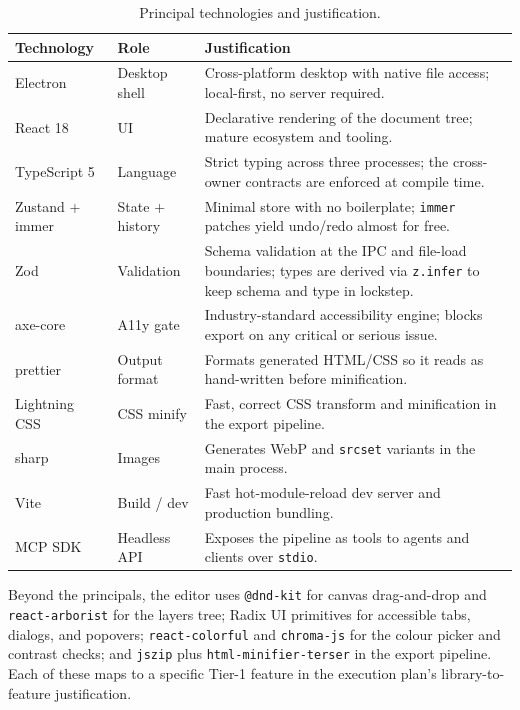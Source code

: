 \begin{table}[H]
  \centering
  \caption{Principal technologies and justification.}
  \label{tab:tech}
  \small
  \begin{tabularx}{\linewidth}{@{}l l X@{}}
    \toprule
    \textbf{Technology} & \textbf{Role} & \textbf{Justification} \\
    \midrule
    Electron \cite{electron} & Desktop shell & Cross-platform desktop with native file access; local-first, no server required. \\
    React 18 \cite{react} & UI & Declarative rendering of the document tree; mature ecosystem and tooling. \\
    TypeScript 5 \cite{typescript} & Language & Strict typing across three processes; the cross-owner contracts are enforced at compile time. \\
    Zustand + immer \cite{zustand,immer} & State + history & Minimal store with no boilerplate; \texttt{immer} patches yield undo/redo almost for free. \\
    Zod \cite{zod} & Validation & Schema validation at the IPC and file-load boundaries; types are derived via \texttt{z.infer} to keep schema and type in lockstep. \\
    axe-core \cite{axecore} & A11y gate & Industry-standard accessibility engine; blocks export on any critical or serious issue. \\
    prettier \cite{prettier} & Output format & Formats generated HTML/CSS so it reads as hand-written before minification. \\
    Lightning CSS \cite{lightningcss} & CSS minify & Fast, correct CSS transform and minification in the export pipeline. \\
    sharp \cite{sharp} & Images & Generates WebP and \texttt{srcset} variants in the main process. \\
    Vite \cite{vite} & Build / dev & Fast hot-module-reload dev server and production bundling. \\
    MCP SDK \cite{mcp-spec} & Headless API & Exposes the pipeline as tools to agents and clients over \texttt{stdio}. \\
    \bottomrule
  \end{tabularx}
\end{table}

Beyond the principals, the editor uses \texttt{@dnd-kit} for canvas drag-and-drop
and \texttt{react-arborist} for the layers tree; Radix UI primitives for accessible
tabs, dialogs, and popovers; \texttt{react-colorful} and \texttt{chroma-js} for the
colour picker and contrast checks; and \texttt{jszip} plus
\texttt{html-minifier-terser} in the export pipeline. Each of these maps to a
specific Tier-1 feature in the execution plan's library-to-feature justification.

